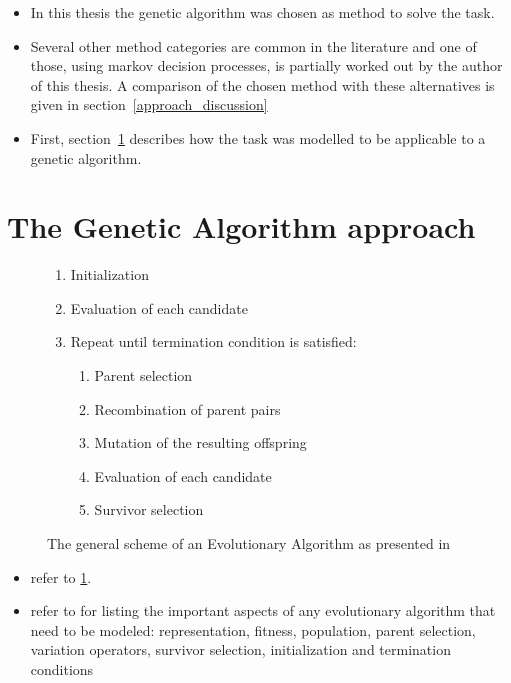 \begin{itemize}
	\item In this thesis the genetic algorithm was chosen as method to solve
		the task.
	\item Several other method categories are common in the literature and one
		of those, using markov decision processes, is partially worked out by
		the author of this thesis. A comparison of the chosen method with
		these alternatives is given in section~\ref{approach_discussion}
	\item First, section~\ref{approach_genetic_algorithm} describes how
		the task was modelled to be applicable to a genetic algorithm.
\end{itemize}
\section{The Genetic Algorithm approach}
\label{approach_genetic_algorithm}
\begin{figure}[ht!]
	\begin{framed}
		\begin{enumerate}
			\item Initialization
			\item Evaluation of each candidate
			\item Repeat until termination condition is satisfied:
				\begin{enumerate}
					\item Parent selection
					\item Recombination of parent pairs
					\item Mutation of the resulting offspring
					\item Evaluation of each candidate
					\item Survivor selection
				\end{enumerate}
		\end{enumerate}
	\end{framed}
	\caption[The evolutionary algorithm]{The general scheme of an
		Evolutionary Algorithm as presented in \citep{Eiben2007}}
	\label{alg:ea_scheme}
\end{figure}
\begin{itemize}
	\item refer to \ref{alg:ea_scheme}.
	\item refer to \citep{Eiben2007} for listing the important aspects of any evolutionary algorithm that need to be modeled: representation, fitness, population, parent selection, variation operators, survivor selection, initialization and termination conditions
\end{itemize}
